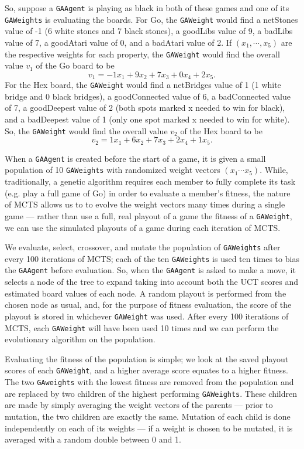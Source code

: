 So, suppose a \texttt{GAAgent} is playing as black in both of these games and one of its \texttt{GAWeights} is evaluating the boards.  For Go, the \texttt{GAWeight} would find a netStones value of -1 (6 white stones and 7 black stones), a goodLibs value of 9, a badLibs value of 7, a goodAtari value of 0, and a badAtari value of 2.  If $(x_1, \cdots, x_5)$ are the respective weights for each property, the \texttt{GAWeight} would find the overall value $v_1$ of the Go board to be 
\[v_1 = -1x_1 + 9x_2 + 7x_3 + 0x_4 + 2x_5.\]
For the Hex board, the \texttt{GAWeight} would find a netBridges value of 1 (1 white bridge and 0 black bridges), a goodConnected value of 6, a badConnected value of 7, a goodDeepest value of 2 (both spots marked x needed to win for black), and a badDeepest value of 1 (only one spot marked x needed to win for white).  So, the \texttt{GAWeight} would find the overall value $v_2$ of the Hex board to be
\[v_2 = 1x_1 + 6x_2 + 7x_3 + 2x_4 + 1x_5.\]

When a \texttt{GAAgent} is created before the start of a game, it is given a small population of 10 \texttt{GAWeights} with randomized weight vectors $(x_1 \cdots x_5)$.  While, traditionally, a genetic algorithm requires each member to fully complete its task (e.g. play a full game of Go) in order to evaluate a member's fitness, the nature of MCTS allows us to to evolve the weight vectors many times during a single game \cite{lucas2014fast} --- rather than use a full, real playout of a game the fitness of a \texttt{GAWeight}, we can use the simulated playouts of a game during each iteration of MCTS.

We evaluate, select, crossover, and mutate the population of \texttt{GAWeights} after every 100 iterations of MCTS; each of the ten \texttt{GAWeights} is used ten times to bias the \texttt{GAAgent} before evaluation.  So, when the \texttt{GAAgent} is asked to make a move, it selects a node of the tree to expand taking into account both the UCT scores and estimated board values of each node.  A random playout is performed from the chosen node as usual, and, for the purpose of fitness evaluation, the score of the playout is stored in whichever \texttt{GAWeight} was used.  After every 100 iterations of MCTS, each \texttt{GAWeight} will have been used 10 times and we can perform the evolutionary algorithm on the population.

Evaluating the fitness of the population is simple; we look at the saved playout scores of each \texttt{GAWeight}, and a higher average score equates to a higher fitness.  The two \texttt{GAweights} with the lowest fitness are removed from the population and are replaced by two children of the highest performing \texttt{GAWeights}.  These children are made by simply averaging the weight vectors of the parents --- prior to mutation, the two children are exactly the same.  Mutation of each child is done independently on each of its weights --- if a weight is chosen to be mutated, it is averaged with a random double between 0 and 1.


